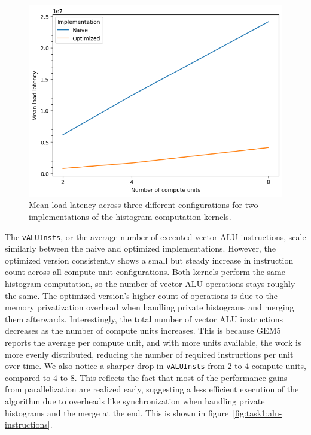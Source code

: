\documentclass[10pt]{article}
\begin{document}
\begin{figure}[htbp]
    \centering
    \includegraphics[width=0.6\linewidth]{images/task1/rs4-t1-mean-load-latency.png}
    \caption{Mean load latency across three different configurations for two implementations of the histogram computation kernels.}
    \label{fig:task1:mean-load-latency}
\end{figure}

The \texttt{vALUInsts}, or the average number of executed vector ALU instructions, scale similarly between the naive and optimized implementations. However, the optimized version consistently shows a small but steady increase in instruction count across all compute unit configurations. Both kernels perform the same histogram computation, so the number of vector ALU operations stays roughly the same. The optimized version's higher count of operations is due to the memory privatization overhead when handling private histograms and merging them afterwards. Interestingly, the total number of vector ALU instructions decreases as the number of compute units increases. This is because GEM5 reports the average per compute unit, and with more units available, the work is more evenly distributed, reducing the number of required instructions per unit over time. We also notice a sharper drop in \texttt{vALUInsts} from 2 to 4 compute units, compared to 4 to 8. This reflects the fact that most of the performance gains from parallelization are realized early, suggesting a less efficient execution of the algorithm due to overheads like synchronization when handling private histograms and the merge at the end. This is shown in figure~\ref{fig:task1:alu-instructions}.
\end{document}
